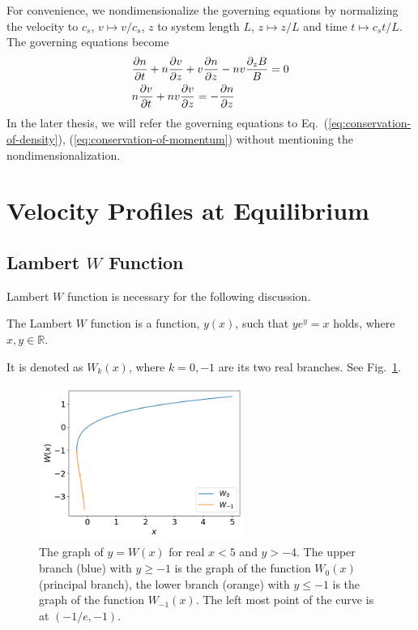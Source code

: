 For convenience, we nondimensionalize the governing equations by normalizing the velocity to $c_s$, $v\mapsto v/c_s$, $z$ to system length $L$, $z \mapsto z/L$ and time $t\mapsto c_s t/L$. The governing equations become
\begin{align}
	 & \pdv{n}{t} + n\pdv{v}{z} + v\pdv{n}{z} - nv\frac{\partial_z B}{B} = 0
	\label{eq:conservation-of-density}
	\\
	 & n\pdv{v}{t} + nv\pdv{v}{z} = -\pdv{n}{z}
	\label{eq:conservation-of-momentum}
\end{align}
In the later thesis, we will refer the governing equations to Eq.~(\ref{eq:conservation-of-density}), (\ref{eq:conservation-of-momentum}) without mentioning the nondimensionalization.

\section{Velocity Profiles at Equilibrium}
\subsection{Lambert $W$ Function}
Lambert $W$ function is necessary for the following discussion.
\begin{definition}
	The Lambert $W$ function is a function, $y(x)$, such that $ye^y = x$ holds, where $x,y\in\mathbb{R}$.
\end{definition}
It is denoted as $W_k(x)$, where $k = 0,-1$ are its two real branches. See Fig.~\ref{fig:lambert-w}.
\begin{figure} [htbp]
	\centering
	\includegraphics[width=0.6\textwidth]{figures/lambert-w.png}
	\caption{The graph of $y=W(x)$ for real $x<5$ and $y>-4$. The upper branch (blue) with $y\geq-1$ is the graph of the function $W_0(x)$ (principal branch), the lower branch (orange) with $y\leq -1$ is the graph of the function $W_{-1}(x)$. The left most point of the curve is at $(-1/e,-1)$.}
	\label{fig:lambert-w}
\end{figure}

